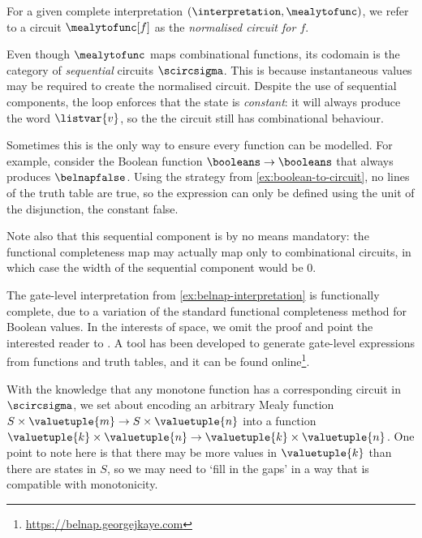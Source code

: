 \documentclass{lmcs}
\begin{document}
For a given complete interpretation \((\interpretation,\mealytofunc)\), we refer
to a circuit \(\mealytofunc[f]\) as the \emph{normalised circuit for \(f\)}.\

\begin{rem}
    Even though \(\mealytofunc\) maps combinational functions, its codomain is
    the category of \emph{sequential} circuits \(\scircsigma\).
    This is because instantaneous values may be required to create the
    normalised circuit.
    Despite the use of sequential components, the loop enforces that the state
    is \emph{constant}: it will always produce the word \(\listvar{v}\), so the
    the circuit still has combinational behaviour.

    Sometimes this is the only way to ensure every function can be modelled.
    For example, consider the Boolean function \(\booleans \to \booleans\) that
    always produces \(\belnapfalse\).
    Using the strategy from \autoref{ex:boolean-to-circuit}, no lines of the truth
    table are true, so the expression can only be defined using the unit of the
    disjunction, the constant false.

    Note also that this sequential component is by no means mandatory: the
    functional completeness map may actually map only to combinational circuits,
    in which case the width of the sequential component would be \(0\).
\end{rem}

\begin{exa}
    The gate-level interpretation from \autoref{ex:belnap-interpretation} is
    functionally complete, due to a variation of the standard functional
    completeness method for Boolean values.
    In the interests of space, we omit the proof and point the interested reader
    to \cite[Sec.\ 4.5]{kaye2025foundations}.
    A tool has been developed to generate gate-level expressions from functions
    and truth tables, and it can be found
    online\footnote{\url{https://belnap.georgejkaye.com}}.
\end{exa}

With the knowledge that any monotone function has a corresponding circuit
in \(\scircsigma\), we set about encoding an arbitrary Mealy function
\(S \times \valuetuple{m} \to S \times \valuetuple{n}\) into a function
\(\valuetuple{k} \times \valuetuple{n} \to \valuetuple{k} \times \valuetuple{n}\).
One point to note here is that there may be more values in \(\valuetuple{k}\)
than there are states in \(S\), so we may need to `fill in the gaps' in a way
that is compatible with monotonicity.
\end{document}
